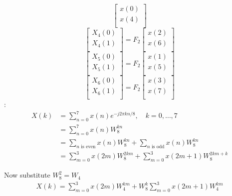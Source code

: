 \documentclass[journal,12pt,twocolumn]{IEEEtran}
\renewcommand\thesection{\arabic{section}}
\begin{document}
\begin{enumerate}[label=\arabic*.,ref=\thesection.\theenumi]
\begin{equation}
\begin{bmatrix}
x(0) \\ 
x(4) \\ 
\end{bmatrix}
\end{equation}
\begin{equation}
\begin{bmatrix}
X_{4}(0) \\ 
X_{4}(1)\\ 
\end{bmatrix}
= F_{2}
\begin{bmatrix}
x(2) \\ 
x(6) \\ 
\end{bmatrix}
\end{equation}
\begin{equation}
\begin{bmatrix}
X_{5}(0) \\ 
X_{5}(1)\\ 
\end{bmatrix}
= F_{2}
\begin{bmatrix}
x(1) \\ 
x(5) \\ 
\end{bmatrix}
\end{equation}
\begin{equation}
\begin{bmatrix}
X_{6}(0) \\ 
X_{6}(1)\\ 
\end{bmatrix}
= F_{2}
\begin{bmatrix}
x(3) \\ 
x(7) \\ 
\end{bmatrix}
\end{equation}
\solution: 
	\begin{align}
        X(k) &= \sum_{n=0}^7 x(n) e^{-j 2 \pi k n / 8}, \quad k=0, \ldots, 7\\
        &= \sum_{n=0}^7 x(n) W_8^{kn} \\
        &= \sum_{n \text{ is even}}x(n) W_8^{kn} + \sum_{n \text{ is odd}}x(n) W_8^{kn} \\
        &= \sum_{m=0}^3 x(2m) W_8^{2km} + \sum_{m=0}^3 x(2m+1) W_8^{2km + k}
    \end{align}	
    
    Now substitute $W_8^2 = W_4$
    \begin{align}
    		X(k) = \sum_{m=0}^3 x(2m) W_4^{km} + W_8^k \sum_{m=0}^3 x(2m+1) W_4^{km}
    \end{align}
    

\end{enumerate}
\end{document}
